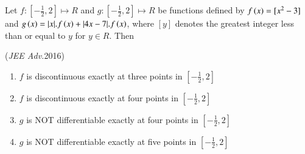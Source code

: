 \documentclass[journal,12pt,twocolumn]{IEEEtran}
\theoremstyle{remark}
\begin{document}
\begin{enumerate}
\begin{flushleft}
    {Let $f:[-\frac{1}{2}, 2]\mapsto R$ and $g:[-\frac{1}{2}, 2]\mapsto R$ be functions defined by $f\left(x\right)=[x^2-3]$ and $g\left(x\right)=|x|.f\left(x\right)+|4x-7|.f\left(x\right)$, where $[y]$ denotes the greatest integer less than or equal to $y$ for $y\in R$. Then}  
       
    \hfill
    {(\textit{JEE Adv.}2016)}
   
    \begin{enumerate}[label=(\alph*)]
       
        \item $f$ is discontinuous exactly at three points in $[-\frac{1}{2}, 2]$
        \item $f$ is discontinuous exactly at four points in $[-\frac{1}{2}, 2]$
        \item $g$ is {NOT} differentiable exactly at four points in $[-\frac{1}{2}, 2]$
        \item $g$ is {NOT} differentiable exactly at five points in $[-\frac{1}{2}, 2]$
    \end{enumerate}
\end{flushleft}

\end{enumerate}
\end{document}

